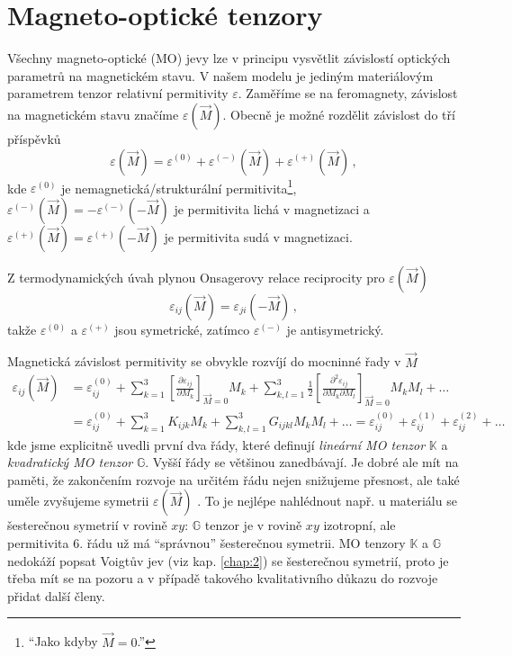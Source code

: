 \section{Magneto-optické tenzory}
\label{chap:magnetoopticke-tenzory}

Všechny magneto-optické (MO) jevy lze v principu vysvětlit závislostí optických parametrů na magnetickém stavu\cite{silberQuadraticMagnetoopticKerr2019a}.
V našem modelu je jediným materiálovým parametrem tenzor relativní permitivity $\varepsilon$.
Zaměříme se na feromagnety, závislost na magnetickém stavu značíme $\varepsilon(\vec{M})$.
Obecně je možné rozdělit závislost do tří příspěvků
\begin{equation}
    \varepsilon(\vec{M})=\varepsilon^{(0)} + \varepsilon^{(-)}(\vec{M}) + \varepsilon^{(+)}(\vec{M}) \,,
\end{equation}
kde $\varepsilon^{(0)}$ je nemagnetická/strukturální permitivita\footnote{``Jako kdyby $\vec{M}=0$.''},
$\varepsilon^{(-)}(\vec{M})=-\varepsilon^{(-)}(-\vec{M})$ je permitivita lichá v magnetizaci
a $\varepsilon^{(+)}(\vec{M})=\varepsilon^{(+)}(-\vec{M})$ je permitivita sudá v magnetizaci.

Z termodynamických úvah plynou Onsagerovy relace reciprocity\cite{onsagerReciprocalRelationsIrreversible1931a,onsagerReciprocalRelationsIrreversible1931} pro $\varepsilon(\vec{M})$
\begin{equation}
    \varepsilon_{ij}(\vec{M})=\varepsilon_{ji}(-\vec{M}) \,,
\end{equation}
takže $\varepsilon^{(0)}$ a $\varepsilon^{(+)}$ jsou symetrické, zatímco $\varepsilon^{(-)}$ je antisymetrický.

Magnetická závislost permitivity se obvykle rozvíjí do mocninné řady v $\vec{M}$ \cite{visnovskyOpticsMagneticMultilayers2018}
\begin{align} 
\label{eqn:MO-tenzory}
    \varepsilon_{ij}(\vec{M})&=\varepsilon^{(0)}_{ij}
        + \sum_{k=1}^{3}\left[ \frac{\partial \varepsilon_{ij}}{\partial M_k}\right]_{\vec{M}=0} M_k 
        + \sum_{k,l=1}^{3} \frac{1}{2}\left[ \frac{\partial^2 \varepsilon_{ij}}{\partial M_k \partial M_l}\right]_{\vec{M}=0} M_k M_l + \dots 
    \\ &=\varepsilon^{(0)}_{ij} 
        + \sum_{k=1}^{3}K_{ijk} M_k 
        + \sum_{k,l=1}^{3} G_{ijkl} M_k M_l + \dots
        =\varepsilon^{(0)}_{ij} +\varepsilon^{(1)}_{ij} +\varepsilon^{(2)}_{ij} + \dots
\end{align}
kde jsme explicitně uvedli první dva řády, které definují \emph{lineární MO tenzor} $\mathbb{K}$ a \emph{kvadratický MO tenzor} $\mathbb{G}$.
Vyšší řády se většinou zanedbávají.
Je dobré ale mít na paměti, že zakončením rozvoje na určitém řádu nejen snižujeme přesnost, ale také uměle zvyšujeme symetrii $\varepsilon(\vec{M})$ \cite{silberQuadraticMagnetoopticKerr2019a}.
To je nejlépe nahlédnout např. u materiálu se šesterečnou symetrií v rovině $xy$: $\mathbb{G}$ tenzor je v rovině $xy$ izotropní, ale permitivita 6. řádu už má ``správnou'' šesterečnou symetrii.
MO tenzory $\mathbb{K}$ a $\mathbb{G}$ nedokáží popsat Voigtův jev (viz kap. \ref{chap:2}) se šesterečnou symetrií, proto je třeba mít se na pozoru a v případě takového kvalitativního důkazu do rozvoje přidat další členy.

